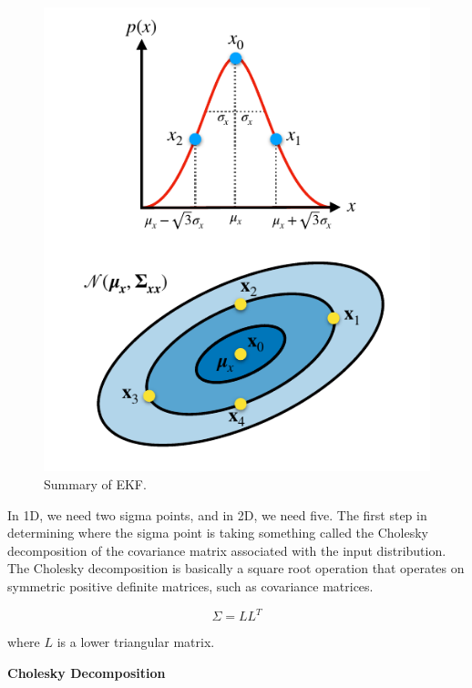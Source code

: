 \begin{figure}[!htb]
\begin{center}
\includegraphics[scale=0.280]{img/kalman_filter/unscented_kalman_filter_2.jpeg}
\end{center}
\caption{Summary of EKF.}
\label{unscented_kalman_filter_2}
\end{figure}

In 1D, we need two sigma points, and in 2D, we need five. The first step in determining where
the sigma point is taking something called the Cholesky decomposition
of the covariance matrix associated with the input distribution. The Cholesky decomposition is basically
a square root operation that operates on symmetric positive definite matrices,
such as covariance matrices. 


\begin{equation}
\Sigma = LL^T
\end{equation}

where $L$ is a lower triangular matrix.

\begin{framed}
\theoremstyle{remark}
\begin{remark}{\textbf{Cholesky Decomposition}}

\end{remark}
\end{framed}

